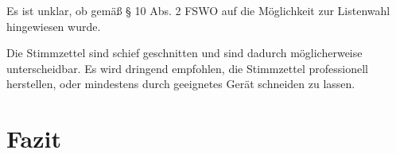 \documentclass[a4paper]{scrartcl}
\begin{document}




Es ist unklar, ob gemäß § 10 Abs. 2 FSWO auf die Möglichkeit zur Listenwahl hingewiesen wurde.

Die Stimmzettel sind schief geschnitten und sind dadurch möglicherweise unterscheidbar. Es wird dringend empfohlen, die Stimmzettel professionell herstellen, oder mindestens durch geeignetes Gerät schneiden zu lassen.






\section{Fazit}


\end{document}

